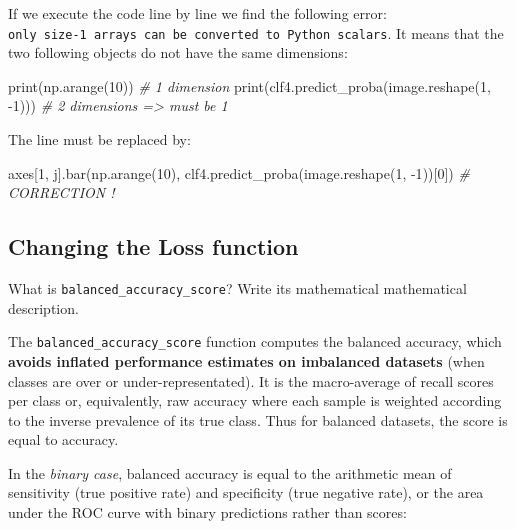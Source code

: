 \documentclass[10pt,a4paper]{article}
\newenvironment{Shaded}{\begin{snugshade}}{\end{snugshade}}
\newcommand{\BuiltInTok}[1]{#1}
\newcommand{\CommentTok}[1]{\textcolor[rgb]{0.56,0.35,0.01}{\textit{#1}}}
\newcommand{\DecValTok}[1]{\textcolor[rgb]{0.00,0.00,0.81}{#1}}
\newcommand{\NormalTok}[1]{#1}
\theoremstyle{break}
\begin{document}
If we execute the code line by line we find the following error:\\
\texttt{only\ size-1\ arrays\ can\ be\ converted\ to\ Python\ scalars}. It means that the two following objects do not have the same dimensions:

\begin{Shaded}
\begin{Highlighting}[]
\BuiltInTok{print}\NormalTok{(np.arange(}\DecValTok{10}\NormalTok{))  }\CommentTok{# 1 dimension}
\BuiltInTok{print}\NormalTok{(clf4.predict_proba(image.reshape(}\DecValTok{1}\NormalTok{, }\DecValTok{-1}\NormalTok{)))  }\CommentTok{# 2 dimensions => must be 1}
\end{Highlighting}
\end{Shaded}

The line must be replaced by:

\begin{Shaded}
\begin{Highlighting}[]
\NormalTok{axes[}\DecValTok{1}\NormalTok{, j].bar(np.arange(}\DecValTok{10}\NormalTok{), clf4.predict_proba(image.reshape(}\DecValTok{1}\NormalTok{, }\DecValTok{-1}\NormalTok{))[}\DecValTok{0}\NormalTok{]) }\CommentTok{# CORRECTION ! }
\end{Highlighting}
\end{Shaded}

\hypertarget{changing-the-loss-function}{%
\subsection{Changing the Loss function}\label{changing-the-loss-function}}

\begin{tcolorbox}

What is \texttt{balanced\_accuracy\_score}? Write its mathematical mathematical description.

\end{tcolorbox}

The \texttt{balanced\_accuracy\_score} function computes the balanced accuracy, which \textbf{avoids inflated performance estimates on imbalanced datasets} (when classes are over or under-representated). It is the macro-average of recall scores per class or, equivalently, raw accuracy where each sample is weighted according to the inverse prevalence of its true class. Thus for balanced datasets, the score is equal to accuracy.

In the \emph{binary case}, balanced accuracy is equal to the arithmetic mean of sensitivity (true positive rate) and specificity (true negative rate), or the area under the ROC curve with binary predictions rather than scores:
\end{document}
